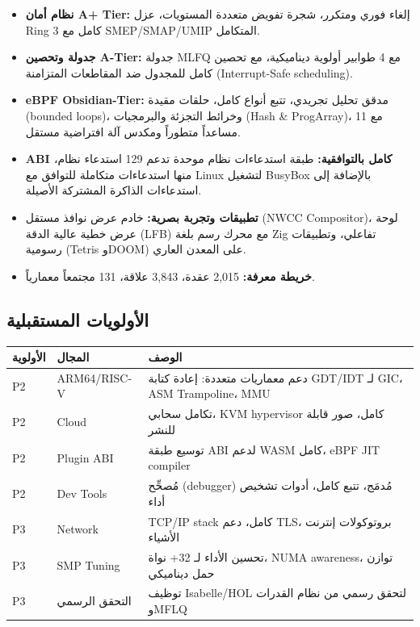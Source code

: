 \documentclass[12pt,a4paper]{article}
\theoremstyle{definition}
\newcommand{\en}[1]{\textenglish{#1}}
\begin{document}
\begin{resultbox}
\begin{itemize}[leftmargin=2em]
\item \textbf{نظام أمان \en{A+ Tier}:} إلغاء فوري ومتكرر، شجرة تفويض متعددة المستويات، عزل \en{Ring 3} كامل مع SMEP/SMAP/UMIP المتكامل.
\item \textbf{جدولة وتحصين \en{A-Tier}:} جدولة \en{MLFQ} مع 4 طوابير أولوية ديناميكية، مع تحصين كامل للمجدول ضد المقاطعات المتزامنة (\en{Interrupt-Safe scheduling}).
\item \textbf{\en{eBPF Obsidian-Tier}:} مدقق تحليل تجريدي، تتبع أنواع كامل، حلقات مقيدة (\en{bounded loops})، وخرائط التجزئة والبرمجيات (\en{Hash \& ProgArray})، مع 11 مساعداً متطوراً ومكدس آلة افتراضية مستقل.
\item \textbf{\en{ABI} كامل بالتوافقية:} طبقة استدعاءات نظام موحدة تدعم 129 استدعاء نظام، منها استدعاءات متكاملة للتوافق مع Linux لتشغيل BusyBox بالإضافة إلى استدعاءات الذاكرة المشتركة الأصيلة.
\item \textbf{تطبيقات وتجربة بصرية:} خادم عرض نوافذ مستقل (\en{NWCC Compositor})، لوحة عرض خطية عالية الدقة (\en{LFB}) مع محرك رسم بلغة Zig تفاعلي، وتطبيقات رسومية (\en{Tetris} و\en{DOOM}) على المعدن العاري.
\item \textbf{خريطة معرفة:} 2,015 عقدة، 3,843 علاقة، 131 مجتمعاً معمارياً.
\end{itemize}
\end{resultbox}

\subsection{الأولويات المستقبلية}

\begin{center}
\begin{tabular}{C{1.2cm}C{2.5cm}L{8cm}}
\toprule
{}
\bfseries\color{white}\textarabic{الأولوية} &
\bfseries\color{white}\textarabic{المجال} &
\bfseries\color{white}\textarabic{الوصف} \\
\midrule
{} \en{P2} & \en{ARM64/RISC-V} &
  دعم معماريات متعددة: إعادة كتابة GDT/IDT لـ GIC، ASM Trampoline، MMU \\
\en{P2} & \en{Cloud} & تكامل سحابي، \en{KVM} \en{hypervisor} كامل، صور قابلة للنشر \\
 \en{P2} & \en{Plugin} \en{ABI} &
  توسيع طبقة \en{ABI} لدعم \en{WASM} كامل، eBPF \en{JIT compiler} \\
\en{P2} & \en{Dev Tools} &
  مُصحِّح (\en{debugger}) مُدمَج، تتبع كامل، أدوات تشخيص أداء \\
 \en{P3} & \en{Network} &
  \en{TCP/IP} stack كامل، دعم \en{TLS}، بروتوكولات إنترنت الأشياء \\
\en{P3} & \en{SMP Tuning} &
  تحسين الأداء لـ 32+ نواة، \en{NUMA awareness}، توازن حمل ديناميكي \\
 \en{P3} & التحقق الرسمي &
  توظيف \en{Isabelle/HOL} لتحقق رسمي من نظام القدرات وMFLQ \\
\bottomrule
\end{tabular}
\end{center}
\end{document}
